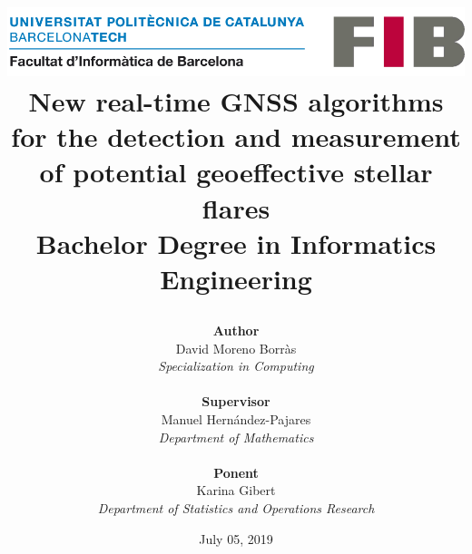 \title{
	{
	\includegraphics[width=0.8\linewidth]{images/cover/logo-fib.png}	
	\vspace{1.3cm} \\
	\textbf{New real-time GNSS algorithms for the detection and measurement of potential geoeffective stellar flares} \\
	\large Bachelor Degree in Informatics Engineering}
\author{\textbf{Author}\\
	David Moreno Borr\`as \\
	\small \textit{Specialization in Computing }
	\\ \\
	\textbf{Supervisor}\\
	Manuel Hernández-Pajares \\
	\small \textit{Department of Mathematics}
	\\ \\
	\textbf{Ponent}\\
	Karina Gibert \\
	\small \textit{Department of Statistics and Operations Research}\\  	
} 
	\vspace{1.3cm}
\date{July 05, 2019}
}
\maketitle
\thispagestyle{empty}
